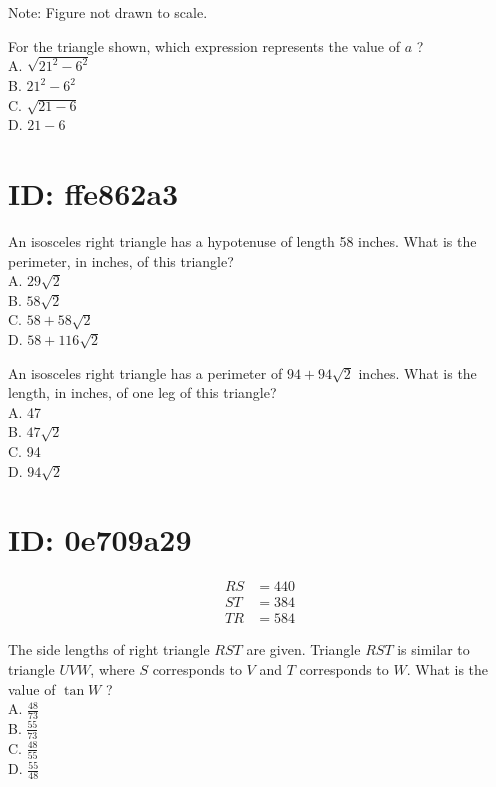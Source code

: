 Note: Figure not drawn to scale.

For the triangle shown, which expression represents the value of $a$ ?\\
A. $\sqrt{21^{2}-6^{2}}$\\
B. $21^{2}-6^{2}$\\
C. $\sqrt{21-6}$\\
D. $21-6$















\section*{ID: ffe862a3}
An isosceles right triangle has a hypotenuse of length 58 inches. What is the perimeter, in inches, of this triangle?\\
A. $29 \sqrt{2}$\\
B. $58 \sqrt{2}$\\
C. $58+58 \sqrt{2}$\\
D. $58+116 \sqrt{2}$

An isosceles right triangle has a perimeter of $94+94 \sqrt{2}$ inches. What is the length, in inches, of one leg of this triangle?\\
A. 47\\
B. $47 \sqrt{2}$\\
C. 94\\
D. $94 \sqrt{2}$

\section*{ID: 0e709a29}
$$
\begin{aligned}
R S & =440 \\
S T & =384 \\
T R & =584
\end{aligned}
$$

The side lengths of right triangle $R S T$ are given. Triangle $R S T$ is similar to triangle $U V W$, where $S$ corresponds to $V$ and $T$ corresponds to $W$. What is the value of $\tan W$ ?\\
A. $\frac{48}{73}$\\
B. $\frac{55}{73}$\\
C. $\frac{48}{55}$\\
D. $\frac{55}{48}$

